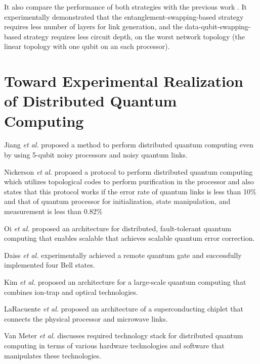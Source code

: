   It also compare the performance of both strategies with the previous work \cite{hypergraph}.  It experimentally demonstrated that the entanglement-swapping-based strategy requires less number of layers for link generation, and the data-qubit-swapping-based strategy requires less circuit depth, on the worst network topology (the linear topology with one qubit on an each processor).

\newpage

\section{Toward Experimental Realization of Distributed Quantum Computing} 

Jiang \textit{et al.}\cite{jiang} proposed a method to perform distributed quantum computing even by using 5-qubit noisy processors and noisy quantum links. 

Nickerson \textit{et al.}\cite{nickerson} proposed a protocol to perform distributed quantum computing which utilizes topological codes to perform purification in the processor and also states that this protocol works if the error rate of quantum links is less than 10\% and that of quantum processor for initialization, state manipulation, and measurement is less than 0.82\% 

Oi \textit{et al.}\cite{oi} proposed an architecture for distributed, fault-tolerant quantum computing that enables scalable that achieves scalable quantum error correction. 

Daiss \textit{et al.}\cite{daiss} experimentally achieved a remote quantum gate and successfully implemented four Bell states. 

Kim \textit{et al.}\cite{kim} proposed an architecture for a large-scale quantum computing that combines ion-trap and optical technologies. 

LaRacuente \textit{et al.}\cite{laracuente} proposed an architecture of a superconducting chiplet that connects the physical processor and microwave links. 

Van Meter \textit{et al.}\cite{van} discusses required technology stack for distributed quantum computing in terms of various hardware technologies and software that manipulates these technologies.




